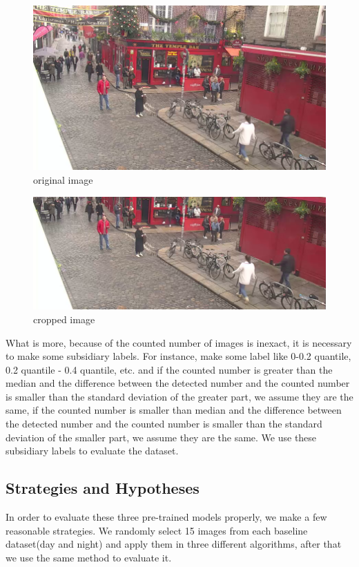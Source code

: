 \documentclass[runningheads]{llncs}
\begin{document}
\begin{figure}[H]
	\includegraphics[width=\textwidth]{figs/eva_original_img.png}
	\caption{original image} \label{fig10.1}
\end{figure}
\begin{figure}
	\includegraphics[width=\textwidth]{figs/eva_cropped_img.png}
	\caption{cropped image} \label{fig10.2}
\end{figure}


What is more, because of the counted number of images is inexact, it is necessary to make some subsidiary labels. For instance, make some label like 0-0.2 quantile, 0.2 quantile - 0.4 quantile, etc. and if the counted number is greater than the median and the difference between the detected number and the counted number is smaller than the standard deviation of the greater part, we assume they are the same, if the counted number is smaller than median and the difference between the detected number and the counted number is smaller than the standard deviation of the smaller part, we assume they are the same. We use these subsidiary labels to evaluate the dataset. 


\subsection{Strategies and Hypotheses}
In order to evaluate these three pre-trained models properly, we make a few reasonable strategies. We randomly select 15 images from each baseline dataset(day and night) and apply them in three different algorithms, after that we use the same method to evaluate it.
\end{document}

